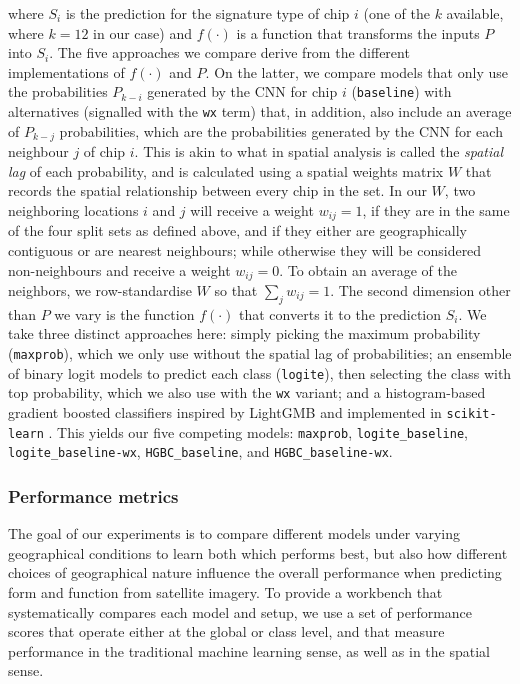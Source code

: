 where $S_i$ is the prediction for the signature type of chip $i$ (one of the $k$ available, where
$k=12$ in our case) and $f(\cdot)$ is a function that
transforms the inputs $P$ into $S_i$. The five
approaches we compare derive from the different implementations of $f(\cdot)$
and $P$. On the latter, we compare models that only use the probabilities
$P_{k-i}$ generated by the CNN for chip $i$ (\texttt{baseline}) with alternatives
(signalled with the \texttt{wx} term) that, in addition,
also include an average of $P_{k-j}$ probabilities, which are the
probabilities generated by the CNN for each neighbour $j$ of chip $i$. This is
akin to what in spatial analysis is called the \textit{spatial lag} of each
probability, and is calculated using a spatial weights matrix $W$ that records
the spatial relationship between every chip in the set. In our $W$, two
neighboring locations $i$ and $j$ will receive a weight $w_{ij}=1$,
if they are in the same of the four split sets as defined above, and if they
either are geographically contiguous or are nearest neighbours; while otherwise
they will be considered non-neighbours and receive a weight $w_{ij}=0$. To obtain
an average of the neighbors, we row-standardise $W$ so that $\sum_j w_{ij} =
1$. The second dimension other than $P$ we vary is the function $f(\cdot)$ that converts
it to the prediction $S_i$. We take three distinct approaches here: simply
picking the maximum probability (\texttt{maxprob}), which we only use without the spatial lag of
probabilities; an ensemble of binary logit models to predict each class
(\texttt{logite}), then selecting the class with top probability, which we
also use with the \texttt{wx} variant; and a histogram-based gradient boosted
classifiers inspired by LightGMB \citep{ke2017lightgbm} and implemented in
\texttt{scikit-learn} \citep{pedregosa2011scikit}. This yields our five
competing models:
\texttt{maxprob}, \texttt{logite\_baseline}, \texttt{logite\_baseline-wx},
\texttt{HGBC\_baseline}, and \texttt{HGBC\_baseline-wx}.

\subsubsection{Performance metrics}

The goal of our experiments is to compare different models under varying
geographical conditions to learn both which performs best, but also how
different choices of geographical nature influence the overall performance
when predicting form and function from satellite imagery.
To provide a workbench that systematically compares each model and setup, we
use a set of performance scores that operate either at the global or class level,
and that measure performance in the traditional machine learning sense, as
well as in the spatial sense.

